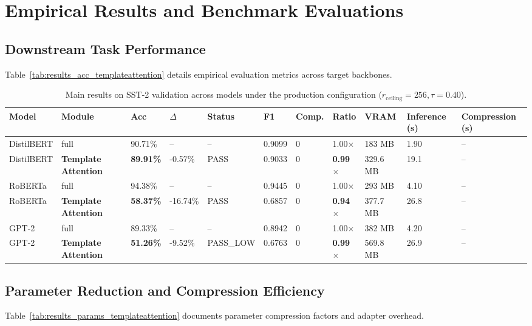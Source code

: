 \section{Empirical Results and Benchmark Evaluations}

\subsection{Downstream Task Performance}
Table~\ref{tab:results_acc_templateattention} details empirical evaluation metrics across target backbones.

\begin{table}[t]
\centering
\small
\begin{tabular}{lllllllllll}
\toprule
\textbf{Model} & \textbf{Module} & \textbf{Acc} & \textbf{$\Delta$} & \textbf{Status} & \textbf{F1} & \textbf{Comp.} & \textbf{Ratio} & \textbf{VRAM} & \textbf{Inference (s)} & \textbf{Compression (s)} \\
\midrule
DistilBERT & full & 90.71\% & -- & -- & 0.9099 & 0 & 1.00$\times$ & 183 MB & 1.90 & -- \\
DistilBERT & \textbf{Template Attention} & \textbf{89.91\%} & -0.57\% & PASS & 0.9033 & 0 & \textbf{0.99$\times$} & 329.6 MB & 19.1 & -- \\
RoBERTa & full & 94.38\% & -- & -- & 0.9445 & 0 & 1.00$\times$ & 293 MB & 4.10 & -- \\
RoBERTa & \textbf{Template Attention} & \textbf{58.37\%} & -16.74\% & PASS & 0.6857 & 0 & \textbf{0.94$\times$} & 377.7 MB & 26.8 & -- \\
GPT-2 & full & 89.33\% & -- & -- & 0.8942 & 0 & 1.00$\times$ & 382 MB & 4.20 & -- \\
GPT-2 & \textbf{Template Attention} & \textbf{51.26\%} & -9.52\% & PASS\_LOW & 0.6763 & 0 & \textbf{0.99$\times$} & 569.8 MB & 26.9 & -- \\
\bottomrule
\end{tabular}
\caption{Main results on SST-2 validation across models under the production configuration ($r_{\mathrm{ceiling}}=256, \tau=0.40$).}
\label{tab:main_sst2}
\end{table}

\subsection{Parameter Reduction and Compression Efficiency}
Table~\ref{tab:results_params_templateattention} documents parameter compression factors and adapter overhead.


